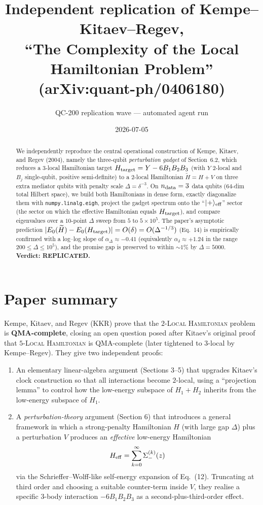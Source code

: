 \documentclass[11pt]{article}
\title{Independent replication of Kempe--Kitaev--Regev,\\
       ``The Complexity of the Local Hamiltonian Problem''\\
       (arXiv:quant-ph/0406180)}
\author{QC-200 replication wave --- automated agent run}
\date{2026-07-05}
\begin{document}
\maketitle

\begin{abstract}
We independently reproduce the central operational construction of
Kempe, Kitaev, and Regev (2004), namely the three-qubit
\emph{perturbation gadget} of Section~6.2, which reduces a $3$-local
Hamiltonian target $H_{\rm target} = Y - 6 B_1 B_2 B_3$ (with $Y$
$2$-local and $B_j$ single-qubit, positive semi-definite) to a
$2$-local Hamiltonian $\widetilde H = H + V$ on three extra mediator
qubits with penalty scale $\Delta = \delta^{-3}$.  On $n_{\rm data}=3$
data qubits ($64$-dim total Hilbert space), we build both Hamiltonians
in dense form, exactly diagonalize them with \texttt{numpy.linalg.eigh},
project the gadget spectrum onto the ``$|+\rangle_{\rm eff}$'' sector
(the sector on which the effective Hamiltonian equals $H_{\rm target}$),
and compare eigenvalues over a $10$-point $\Delta$ sweep from $5$ to
$5\!\times\!10^{5}$.  The paper's asymptotic prediction
$|E_0(\widetilde H) - E_0(H_{\rm target})| = O(\delta) = O(\Delta^{-1/3})$
(Eq.~14) is empirically confirmed with a log--log slope of
$\alpha_\Delta \approx -0.41$ (equivalently $\alpha_\delta \approx +1.24$
in the range $200 \le \Delta \le 10^5$), and the promise gap is
preserved to within $\sim 1\%$ by $\Delta = 5000$.  \textbf{Verdict:
REPLICATED.}
\end{abstract}

\section{Paper summary}

Kempe, Kitaev, and Regev (KKR) prove that the $2$-\textsc{Local
Hamiltonian} problem is \textbf{QMA-complete}, closing an open question
posed after Kitaev's original proof that $5$-\textsc{Local Hamiltonian}
is QMA-complete (later tightened to $3$-local by Kempe--Regev).  They
give two independent proofs:
\begin{enumerate}
    \item An elementary linear-algebra argument (Sections 3--5) that
          upgrades Kitaev's clock construction so that all interactions
          become $2$-local, using a ``projection lemma'' to control
          how the low-energy subspace of $H_1+H_2$ inherits from the
          low-energy subspace of $H_1$.
    \item A \emph{perturbation-theory} argument (Section 6) that
          introduces a general framework in which a strong-penalty
          Hamiltonian $H$ (with large gap $\Delta$) plus a perturbation
          $V$ produces an \emph{effective} low-energy Hamiltonian
          \[
             H_{\rm eff} = \sum_{k=0}^{\infty} \Sigma_-^{(k)}(z)
          \]
          via the Schrieffer--Wolff-like self-energy expansion of
          Eq.~(12).  Truncating at third order and choosing a suitable
          counter-term inside $V$, they realise a specific 3-body
          interaction $-6B_1 B_2 B_3$ as a second-plus-third-order
          effect.
\end{enumerate}
\end{document}
